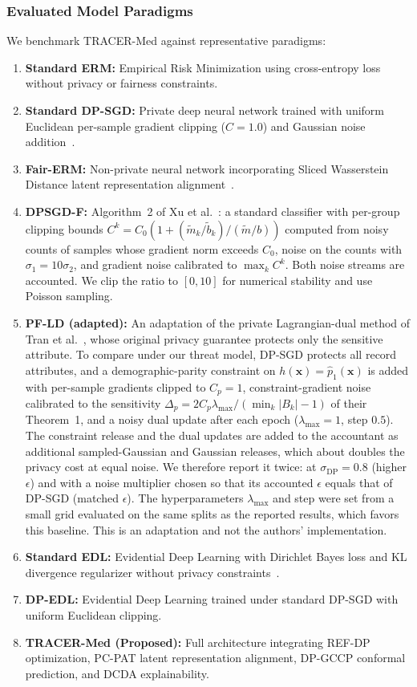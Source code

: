 \documentclass[pdflatex,sn-vancouver-num,referee,lineno]{sn-jnl}
\theoremstyle{thmstyleone}
\theoremstyle{thmstylethree}
\begin{document}
\subsubsection{Evaluated Model Paradigms}
We benchmark TRACER-Med against representative paradigms:
\begin{enumerate}
    \item \textbf{Standard ERM:} Empirical Risk Minimization using cross-entropy loss without privacy or fairness constraints.
    \item \textbf{Standard DP-SGD:} Private deep neural network trained with uniform Euclidean per-sample gradient clipping ($C=1.0$) and Gaussian noise addition~\cite{abadi2016deep}.
    \item \textbf{Fair-ERM:} Non-private neural network incorporating Sliced Wasserstein Distance latent representation alignment~\cite{bonneel2015sliced}.
    \item \textbf{DPSGD-F:} Algorithm~2 of Xu et al.~\cite{xu2021removing}: a standard classifier with per-group clipping bounds $C^k = C_0(1 + (\tilde{m}_k/\tilde{b}_k)/(\tilde{m}/b))$ computed from noisy counts of samples whose gradient norm exceeds $C_0$, noise on the counts with $\sigma_1 = 10\sigma_2$, and gradient noise calibrated to $\max_k C^k$. Both noise streams are accounted. We clip the ratio to $[0, 10]$ for numerical stability and use Poisson sampling.
    \item \textbf{PF-LD (adapted):} An adaptation of the private Lagrangian-dual method of Tran et al.~\cite{tran2021differentially}, whose original privacy guarantee protects only the sensitive attribute. To compare under our threat model, DP-SGD protects all record attributes, and a demographic-parity constraint on $h(\mathbf{x}) = \hat{p}_1(\mathbf{x})$ is added with per-sample gradients clipped to $C_p = 1$, constraint-gradient noise calibrated to the sensitivity $\Delta_p = 2C_p\lambda_{\max}/(\min_k |B_k| - 1)$ of their Theorem~1, and a noisy dual update after each epoch ($\lambda_{\max} = 1$, step $0.5$). The constraint release and the dual updates are added to the accountant as additional sampled-Gaussian and Gaussian releases, which about doubles the privacy cost at equal noise. We therefore report it twice: at $\sigma_{\text{DP}} = 0.8$ (higher $\epsilon$) and with a noise multiplier chosen so that its accounted $\epsilon$ equals that of DP-SGD (matched $\epsilon$). The hyperparameters $\lambda_{\max}$ and step were set from a small grid evaluated on the same splits as the reported results, which favors this baseline. This is an adaptation and not the authors' implementation.
    \item \textbf{Standard EDL:} Evidential Deep Learning with Dirichlet Bayes loss and KL divergence regularizer without privacy constraints~\cite{sensoy2018evidential}.
    \item \textbf{DP-EDL:} Evidential Deep Learning trained under standard DP-SGD with uniform Euclidean clipping.
    \item \textbf{TRACER-Med (Proposed):} Full architecture integrating REF-DP optimization, PC-PAT latent representation alignment, DP-GCCP conformal prediction, and DCDA explainability.
\end{enumerate}
\end{document}
